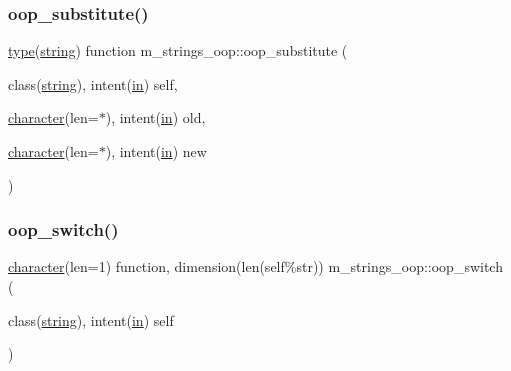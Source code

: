 \mbox{\label{namespacem__strings__oop_af653c84bbd0165d1d4a3b61efe0472e8}} 
\subsubsection{\texorpdfstring{oop\+\_\+substitute()}{oop\_substitute()}}
{\footnotesize\ttfamily \hyperlink{stop__watch_83_8txt_a70f0ead91c32e25323c03265aa302c1c}{type}(\hyperlink{structm__strings__oop_1_1string}{string}) function m\+\_\+strings\+\_\+oop\+::oop\+\_\+substitute (\begin{DoxyParamCaption}\item[{class(\hyperlink{structm__strings__oop_1_1string}{string}), intent(\hyperlink{M__journal_83_8txt_afce72651d1eed785a2132bee863b2f38}{in})}]{self,  }\item[{\hyperlink{option__stopwatch_83_8txt_abd4b21fbbd175834027b5224bfe97e66}{character}(len=$\ast$), intent(\hyperlink{M__journal_83_8txt_afce72651d1eed785a2132bee863b2f38}{in})}]{old,  }\item[{\hyperlink{option__stopwatch_83_8txt_abd4b21fbbd175834027b5224bfe97e66}{character}(len=$\ast$), intent(\hyperlink{M__journal_83_8txt_afce72651d1eed785a2132bee863b2f38}{in})}]{new }\end{DoxyParamCaption})\hspace{0.3cm}{\ttfamily [private]}}

\mbox{\label{namespacem__strings__oop_a31be80e67fa4829b5ac48c530bd58b7b}} 
\subsubsection{\texorpdfstring{oop\+\_\+switch()}{oop\_switch()}}
{\footnotesize\ttfamily \hyperlink{option__stopwatch_83_8txt_abd4b21fbbd175834027b5224bfe97e66}{character}(len=1) function, dimension(len(self\%str)) m\+\_\+strings\+\_\+oop\+::oop\+\_\+switch (\begin{DoxyParamCaption}\item[{class(\hyperlink{structm__strings__oop_1_1string}{string}), intent(\hyperlink{M__journal_83_8txt_afce72651d1eed785a2132bee863b2f38}{in})}]{self }\end{DoxyParamCaption})\hspace{0.3cm}{\ttfamily [private]}}

